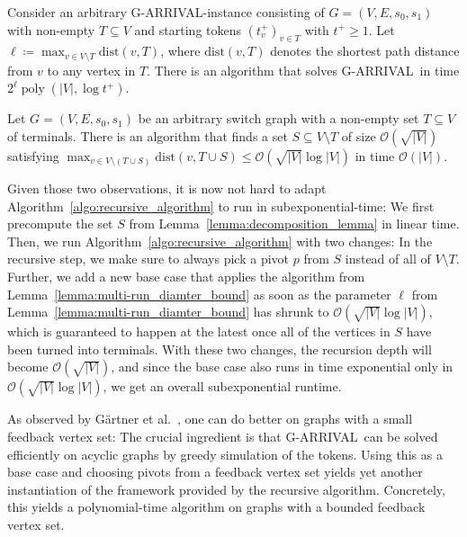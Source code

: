\documentclass[a4paper,UKenglish,cleveref, autoref, thm-restate]{lipics-v2021}
\newcommand{\bigO}{\mathcal{O}}
\DeclareMathOperator{\poly}{poly}
\newcommand{\problem}[1]{\textrm{#1}}
\newcommand{\garrival}{\problem{G-ARRIVAL}}
\begin{document}
\begin{lemma}
\label{lemma:multi-run_diamter_bound}
    Consider an arbitrary \garrival-instance consisting of $G = (V, E, s_0, s_1)$ with non-empty $T \subseteq V$ and starting tokens $(t^+_v)_{v \in T}$ with $t^+ \geq 1$. Let $\ell \coloneqq \max_{v \in V \setminus T} \text{dist}(v, T)$, where $\text{dist}(v, T)$ denotes the shortest path distance from $v$ to any vertex in $T$. There is an algorithm that solves \garrival\ in time $2^\ell \poly(|V|, \log t^+)$. 
\end{lemma}

\begin{lemma}
\label{lemma:decomposition_lemma}
    Let $G = (V, E, s_0, s_1)$ be an arbitrary switch graph with a non-empty set $T \subseteq V$ of terminals. There is an algorithm that finds a set $S \subseteq V \setminus T$ of size $\bigO(\sqrt{|V|})$ satisfying $\max_{v \in V \setminus (T \cup S)} \text{dist}(v, T \cup S) \leq \bigO(\sqrt{|V|} \log |V|)$ in time $\bigO(|V|)$.
\end{lemma}

Given those two observations, it is now not hard to adapt Algorithm~\ref{algo:recursive_algorithm} to run in subexponential-time: We first precompute the set $S$ from Lemma~\ref{lemma:decomposition_lemma} in linear time. Then, we run Algorithm~\ref{algo:recursive_algorithm} with two changes: In the recursive step, we make sure to always pick a pivot $p$ from $S$ instead of all of $V \setminus T$. Further, we add a new base case that applies the algorithm from Lemma~\ref{lemma:multi-run_diamter_bound} as soon as the parameter $\ell$ from Lemma~\ref{lemma:multi-run_diamter_bound} has shrunk to $\bigO(\sqrt{|V|} \log |V|)$, which is guaranteed to happen at the latest once all of the vertices in $S$ have been turned into terminals. With these two changes, the recursion depth will become $\bigO(\sqrt{|V|})$, and since the base case also runs in time exponential only in $\bigO(\sqrt{|V|} \log |V|)$, we get an overall subexponential runtime. 

As observed by Gärtner et al.\@~\cite{gartnerSubexponentialAlgorithmARRIVAL2021}, one can do better on graphs with a small feedback vertex set: The crucial ingredient is that \garrival\ can be solved efficiently on acyclic graphs by greedy simulation of the tokens. Using this as a base case and choosing pivots from a feedback vertex set yields yet another instantiation of the framework provided by the recursive algorithm. Concretely, this yields a polynomial-time algorithm on graphs with a bounded feedback vertex set.  
\end{document}
